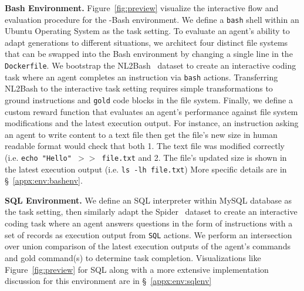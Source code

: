 

\textbf{Bash Environment.} Figure~\ref{fig:preview} visualize the interactive flow and evaluation procedure for the \benchmark{}-Bash environment. We define a \texttt{bash} shell within an Ubuntu Operating System as the task setting.
To evaluate an agent's ability to adapt generations to different situations, we architect four distinct file systems that can be swapped into the Bash environment by changing a single line in the \texttt{Dockerfile}.
We bootstrap the NL2Bash~\cite{lin-etal-2018-nl2bash} dataset to create an interactive coding task where an agent completes an instruction via \texttt{bash} actions. Transferring NL2Bash to the interactive task setting requires simple transformations to ground instructions and \texttt{gold} code blocks in the file system.
Finally, we define a custom reward function that evaluates an agent's performance against file system modifications and the latest execution output.
For instance, an instruction asking an agent to write content to a text file then get the file's new size in human readable format would check that both 1. The text file was modified correctly (i.e. \texttt{echo "Hello" $>>$ file.txt} and 2. The file's updated size is shown in the latest execution output (i.e. \texttt{ls -lh file.txt})
More specific details are in \S~\ref{appx:env:bashenv}.

\textbf{SQL Environment.} We define an SQL interpreter within MySQL database as the task setting, then similarly adapt the Spider~\cite{yu-etal-2018-spider} dataset to create an interactive coding task where an agent answers questions in the form of instructions with a set of records as execution output from \texttt{SQL} actions. We perform an intersection over union comparison of the latest execution outputs of the agent's commands and gold command(s) to determine task completion. Visualizations like Figure~\ref{fig:preview} for SQL along with a more extensive implementation discussion for this environment are in \S~\ref{appx:env:sqlenv}

